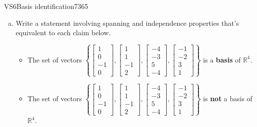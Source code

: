 \begin{exercise}{VS6}{Basis identification}{7365} 
\begin{exerciseStatement} 

\begin{enumerate}[(a)]
\item  

 Write a statement involving spanning and independence properties that's equivalent to each claim below. 

 

\begin{itemize}
\item  

 The set of vectors \(\left\{ \left[\begin{array}{c}
1 \\
0 \\
-1 \\
0
\end{array}\right] , \left[\begin{array}{c}
1 \\
1 \\
-1 \\
2
\end{array}\right] , \left[\begin{array}{c}
-4 \\
-3 \\
5 \\
-4
\end{array}\right] , \left[\begin{array}{c}
-1 \\
-2 \\
3 \\
1
\end{array}\right] \right\}\) is a \textbf{basis} of \(\mathbb{R}^4\). 

 
\item  

 The set of vectors \(\left\{ \left[\begin{array}{c}
1 \\
0 \\
-1 \\
0
\end{array}\right] , \left[\begin{array}{c}
1 \\
1 \\
-1 \\
2
\end{array}\right] , \left[\begin{array}{c}
-4 \\
-3 \\
5 \\
-4
\end{array}\right] , \left[\begin{array}{c}
-1 \\
-2 \\
3 \\
1
\end{array}\right] \right\}\) is \textbf{not} a basis of \(\mathbb{R}^4\). 


\end{itemize}
\end{enumerate}
\end{exerciseStatement}
\end{exercise}
